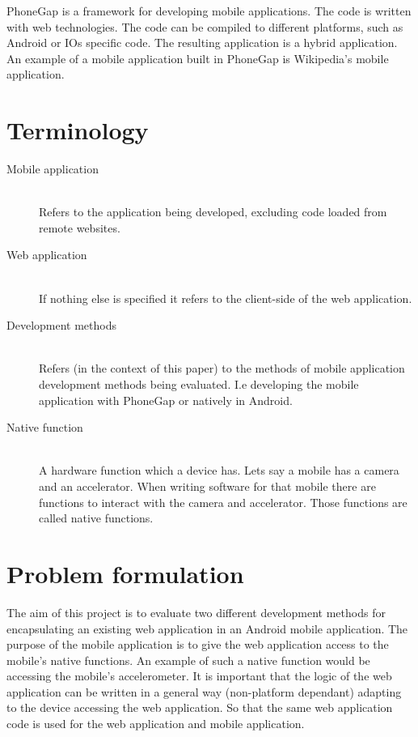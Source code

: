 PhoneGap is a framework for developing mobile applications. The code is written with web technologies. The code can be compiled to different platforms, such as Android or IOs specific code. The resulting application is a hybrid application. An example of a mobile application built in PhoneGap is Wikipedia's mobile application.  

\section{Terminology}
\begin{description}
  \item[Mobile application] \hfill \\
    Refers to the application being developed, excluding code loaded from remote websites.
  \item[Web application] \hfill \\
    If nothing else is specified it refers to the client-side of the web application.
  \item[Development methods] \hfill \\
    Refers (in the context of this paper) to the methods of mobile application development methods being evaluated. I.e developing the mobile application with PhoneGap or natively in Android.
  \item[Native function] \hfill \\
     A hardware function which a device has. Lets say a mobile has a camera and an accelerator. When writing software for that mobile there are functions to interact with the camera and accelerator. Those functions are called native functions.
\end{description}

\section{Problem formulation}
The aim of this project is to evaluate two different development methods for encapsulating an existing web application in an Android mobile application. The purpose of the mobile application is to give the web application access to the mobile's native functions. An example of such a native function would be accessing the mobile's accelerometer. It is important that the logic of the web application can be written in a general way (non-platform dependant) adapting to the device accessing the web application. So that the same web application code is used for the web application and mobile application.


